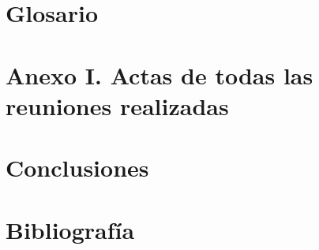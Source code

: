\documentclass{article}
\begin{document}
\section*{Glosario}

\section*{Anexo I. Actas de todas las reuniones realizadas}

\section{Conclusiones}

\section{Bibliografía}
\end{document}
